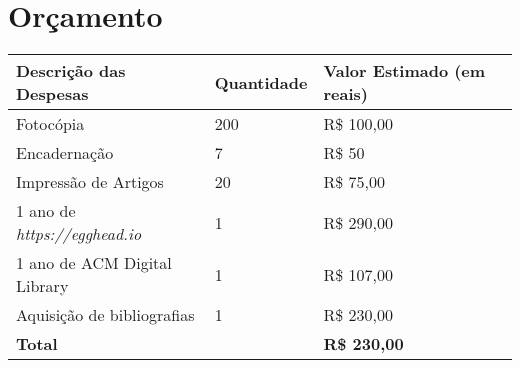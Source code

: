 \section{Orçamento}\label{lorcamento}

\begin{center}
    \begin{tabular}{| l | l | l | l |}
    \hline
    \textbf{Descrição das Despesas} & \textbf{Quantidade} & \textbf{Valor Estimado (em reais)} \\ \hline
    Fotocópia & 200 & R\$ 100,00 \\ \hline
    Encadernação & 7 & R\$ 50 \\ \hline
    Impressão de Artigos & 20 & R\$ 75,00 \\ \hline
    1 ano de \textit{https://egghead.io} & 1 & R\$ 290,00 \\ \hline
    1 ano de ACM Digital Library & 1 & R\$ 107,00 \\ \hline
    Aquisição de bibliografias & 1 & R\$ 230,00 \\
    \hline \hline
    \textbf{Total} & & \textbf{R\$ 230,00} \\
    \hline
    \end{tabular}
\end{center}
